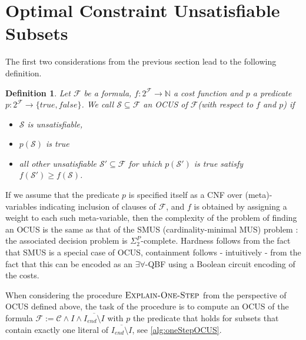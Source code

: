 \documentclass[twoside,11pt]{article}
\newcommand\m[1]{\mathcal{#1}}
\newtheorem{definition}[thm]{Definition}
\newcommand\comment[1]{\marginpar{\tiny #1}}
\renewcommand\comment[1]{#1}
\newcommand{\tias}[1]{{\comment{\color{blue}Tias:#1}}}
\newcommand{\bart}[1]{{\comment{\color{green}Bart: #1}}}
\newcommand\Iend{\ensuremath{I_\mathit{end} }\xspace}
\newcommand\formula{\ensuremath{\m{F} }\xspace}
\newcommand\formulac{\ensuremath{\m{C} }\xspace}
\newcommand\formulag{\ensuremath{\m{G} }\xspace}
\newcommand\mm[1]{\ensuremath{#1}\xspace}
\newcommand\nat{\mm{\mathbb{N}}}
\newcommand\call[1]{\mm{\textsc{#1}}}
\newcommand\onestep{\ensuremath{\call{Explain-One-Step}}\xspace}
\begin{document}
\section{Optimal Constraint Unsatisfiable Subsets}


The first two considerations from the previous section lead to the following definition. 

\begin{definition}
Let $\formula$ be a formula, $f:2^{\formula} \to \nat$ a cost function and  $p$ a predicate $p: 2^{\formula}\to \{true,false\}$.  We call %
$\m{S} \subseteq \formula$ an OCUS of \formula (with respect to $f$ and $p$) if \begin{itemize}                                      
\item $\m{S}$ is unsatisfiable,
\item $p(\m{S})$ is true
\item all other unsatisfiable $\m{S}'\subseteq \formula$ for which $p(\m{S}')$ is true satisfy $f(\m{S}')\geq f(\m{S})$.
\end{itemize}
\end{definition}


If we assume that the predicate $p$ is specified itself as a CNF over (meta)-variables indicating inclusion of clauses of $\m{F}$, and $f$ is obtained by assigning a weight to each such meta-variable, then the complexity of the problem of finding an OCUS is the same as that of the SMUS (cardinality-minimal MUS) problem  \cite{ignatiev2015smallest}: the associated decision problem is $\Sigma^P_2$-complete. Hardness follows from the fact that SMUS is a special case of OCUS, containment follows - intuitively - from the fact that this can be encoded as an $\exists\forall$-QBF using a Boolean circuit encoding of the costs. 

When considering the procedure \onestep from the perspective of OCUS defined above, the task of the procedure  is to compute an OCUS of the formula $\formula := \formulac\land I\land \overline{\Iend\setminus I}$ with $p$ the predicate that holds for subsets  that contain exactly one literal of $\overline{\Iend\setminus I}$, see \cref{alg:oneStepOCUS}. 
\end{document}
